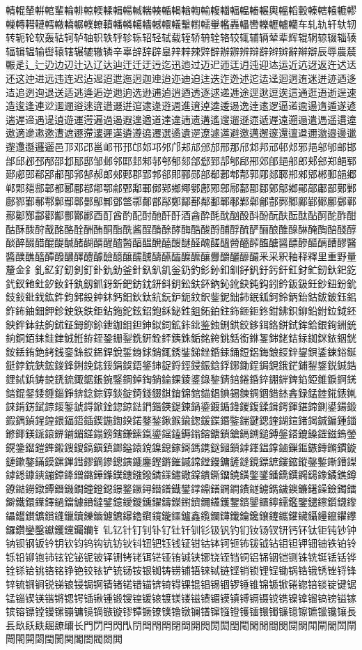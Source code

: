 輤輥輦輧輨輩輪輫輬輭輮輯輰輱輲輳輴輵輶輷輸輹輺輻輼輽輾輿轀轁轂轃轄轅轆轇轈轉轊轋轌轍轎轏轐轑轒轓轔轕轖轗轘轙轚轛轜轝轞轟轠轡轢轣轤轥车轧轨轩轪轫转轭轮软轰轱轲轳轴轵轶轷轸轹轺轻轼载轾轿辀辁辂较辄辅辆辇辈辉辊辋辌辍辎辏辐辑辒输辔辕辖辗辘辙辚辛辜辝辞辟辠辡辢辣辤辥辦辧辨辩辪辫辬辭辮辯辰辱農辳辴辵辶辷辸边辺辻込辽达辿迀迁迂迃迄迅迆过迈迉迊迋迌迍迎迏运近迒迓返迕迖迗还这迚进远违连迟迠迡迢迣迤迥迦迧迨迩迪迫迬迭迮迯述迱迲迳迴迵迶迷迸迹迺迻迼追迾迿退送适逃逄逅逆逇逈选逊逋逌逍逎透逐逑递逓途逕逖逗逘這通逛逜逝逞速造逡逢連逤逥逦逧逨逩逪逫逬逭逮逯逰週進逳逴逵逶逷逸逹逺逻逼逽逾逿遀遁遂遃遄遅遆遇遈遉遊運遌遍過遏遐遑遒道達違遖遗遘遙遚遛遜遝遞遟遠遡遢遣遤遥遦遧遨適遪遫遬遭遮遯遰遱遲遳遴遵遶遷選遹遺遻遼遽遾避邀邁邂邃還邅邆邇邈邉邊邋邌邍邎邏邐邑邒邓邔邕邖邗邘邙邚邛邜邝邞邟邠邡邢那邤邥邦邧邨邩邪邫邬邭邮邯邰邱邲邳邴邵邶邷邸邹邺邻邼邽邾邿郀郁郂郃郄郅郆郇郈郉郊郋郌郍郎郏郐郑郒郓郔郕郖郗郘郙郚郛郜郝郞郟郠郡郢郣郤郥郦郧部郩郪郫郬郭郮郯郰郱郲郳郴郵郶郷郸郹郺郻郼都郾郿鄀鄁鄂鄃鄄鄅鄆鄇鄈鄉鄊鄋鄌鄍鄎鄏鄐鄑鄒鄓鄔鄕鄖鄗鄘鄙鄚鄛鄜鄝鄞鄟鄠鄡鄢鄣鄤鄥鄦鄧鄨鄩鄪鄫鄬鄭鄮鄯鄰鄱鄲鄳鄴鄵鄶鄷鄸鄹鄺鄻鄼鄽鄾鄿酀酁酂酃酄酅酆酇酈酉酊酋酌配酎酏酐酑酒酓酔酕酖酗酘酙酚酛酜酝酞酟酠酡酢酣酤酥酦酧酨酩酪酫酬酭酮酯酰酱酲酳酴酵酶酷酸酹酺酻酼酽酾酿醀醁醂醃醄醅醆醇醈醉醊醋醌醍醎醏醐醑醒醓醔醕醖醗醘醙醚醛醜醝醞醟醠醡醢醣醤醥醦醧醨醩醪醫醬醭醮醯醰醱醲醳醴醵醶醷醸醹醺醻醼醽醾醿釀釁釂釃釄釅釆采釈釉释釋里重野量釐金釒釓釔釕釖釗釘釙釚釛釜針釞釟釠釡釢釣釤釥釦釧釨釩釪釫釬釭釮釯釰釱釲釳釴釵釶釷釸釹釺釻釼釽釾釿鈀鈁鈂鈃鈄鈅鈆鈇鈈鈉鈊鈋鈌鈍鈎鈏鈐鈑鈒鈓鈔鈕鈖鈗鈘鈙鈚鈛鈜鈝鈞鈟鈠鈡鈢鈣鈤鈥鈦鈧鈨鈩鈪鈫鈬鈭鈮鈯鈰鈱鈲鈳鈴鈵鈶鈷鈸鈹鈺鈻鈼鈽鈾鈿鉀鉁鉂鉃鉄鉅鉆鉇鉈鉉鉊鉋鉌鉍鉎鉏鉐鉑鉒鉓鉔鉕鉖鉗鉘鉙鉚鉛鉜鉝鉞鉟鉠鉡鉢鉣鉤鉥鉦鉧鉨鉩鉪鉫鉬鉭鉮鉯鉰鉱鉲鉳鉴鉵鉶鉷鉸鉹鉺鉻鉼鉽鉾鉿銀銁銂銃銄銅銆銇銈銉銊銋銌銍銎銏銐銑銒銓銔銕銖銗銘銙銚銛銜銝銞銟銠銡銢銣銤銥銦銧銨銩銪銫銬銭銮銯銰銱銲銳銴銵銶銷銸銹銺銻銼銽銾銿鋀鋁鋂鋃鋄鋅鋆鋇鋈鋉鋊鋋鋌鋍鋎鋏鋐鋑鋒鋓鋔鋕鋖鋗鋘鋙鋚鋛鋜鋝鋞鋟鋠鋡鋢鋣鋤鋥鋦鋧鋨鋩鋪鋫鋬鋭鋮鋯鋰鋱鋲鋳鋴鋵鋶鋷鋸鋹鋺鋻鋼鋽鋾鋿錀錁錂錃錄錅錆錇錈錉錊錋錌錍錎錏錐錑錒錓錔錕錖錗錘錙錚錛錜錝錞錟錠錡錢錣錤錥錦錧錨錩錪錫錬錭錮錯錰錱録錳錴錵錶錷錸錹錺錻錼錽錾錿鍀鍁鍂鍃鍄鍅鍆鍇鍈鍉鍊鍋鍌鍍鍎鍏鍐鍑鍒鍓鍔鍕鍖鍗鍘鍙鍚鍛鍜鍝鍞鍟鍠鍡鍢鍣鍤鍥鍦鍧鍨鍩鍪鍫鍬鍭鍮鍯鍰鍱鍲鍳鍴鍵鍶鍷鍸鍹鍺鍻鍼鍽鍾鍿鎀鎁鎂鎃鎄鎅鎆鎇鎈鎉鎊鎋鎌鎍鎎鎏鎐鎑鎒鎓鎔鎕鎖鎗鎘鎙鎚鎛鎜鎝鎞鎟鎠鎡鎢鎣鎤鎥鎦鎧鎨鎩鎪鎫鎬鎭鎮鎯鎰鎱鎲鎳鎴鎵鎶鎷鎸鎹鎺鎻鎼鎽鎾鎿鏀鏁鏂鏃鏄鏅鏆鏇鏈鏉鏊鏋鏌鏍鏎鏏鏐鏑鏒鏓鏔鏕鏖鏗鏘鏙鏚鏛鏜鏝鏞鏟鏠鏡鏢鏣鏤鏥鏦鏧鏨鏩鏪鏫鏬鏭鏮鏯鏰鏱鏲鏳鏴鏵鏶鏷鏸鏹鏺鏻鏼鏽鏾鏿鐀鐁鐂鐃鐄鐅鐆鐇鐈鐉鐊鐋鐌鐍鐎鐏鐐鐑鐒鐓鐔鐕鐖鐗鐘鐙鐚鐛鐜鐝鐞鐟鐠鐡鐢鐣鐤鐥鐦鐧鐨鐩鐪鐫鐬鐭鐮鐯鐰鐱鐲鐳鐴鐵鐶鐷鐸鐹鐺鐻鐼鐽鐾鐿鑀鑁鑂鑃鑄鑅鑆鑇鑈鑉鑊鑋鑌鑍鑎鑏鑐鑑鑒鑓鑔鑕鑖鑗鑘鑙鑚鑛鑜鑝鑞鑟鑠鑡鑢鑣鑤鑥鑦鑧鑨鑩鑪鑫鑬鑭鑮鑯鑰鑱鑲鑳鑴鑵鑶鑷鑸鑹鑺鑻鑼鑽鑾鑿钀钁钂钃钄钅钆钇针钉钊钋钌钍钎钏钐钑钒钓钔钕钖钗钘钙钚钛钜钝钞钟钠钡钢钣钤钥钦钧钨钩钪钫钬钭钮钯钰钱钲钳钴钵钶钷钸钹钺钻钼钽钾钿铀铁铂铃铄铅铆铇铈铉铊铋铌铍铎铏铐铑铒铓铔铕铖铗铘铙铚铛铜铝铞铟铠铡铢铣铤铥铦铧铨铩铪铫铬铭铮铯铰铱铲铳铴铵银铷铸铹铺铻铼铽链铿销锁锂锃锄锅锆锇锈锉锊锋锌锍锎锏锐锑锒锓锔锕锖锗锘错锚锛锜锝锞锟锠锡锢锣锤锥锦锧锨锩锪锫锬锭键锯锰锱锲锳锴锵锶锷锸锹锺锻锼锽锾锿镀镁镂镃镄镅镆镇镈镉镊镋镌镍镎镏镐镑镒镓镔镕镖镗镘镙镚镛镜镝镞镟镠镡镢镣镤镥镦镧镨镩镪镫镬镭镮镯镰镱镲镳镴镵镶長镸镹镺镻镼镽镾长門閁閂閃閄閅閆閇閈閉閊開閌閍閎閏閐閑閒間閔閕閖閗閘閙閚閛閜閝閞閟閠閡関閣閤閥閦閧